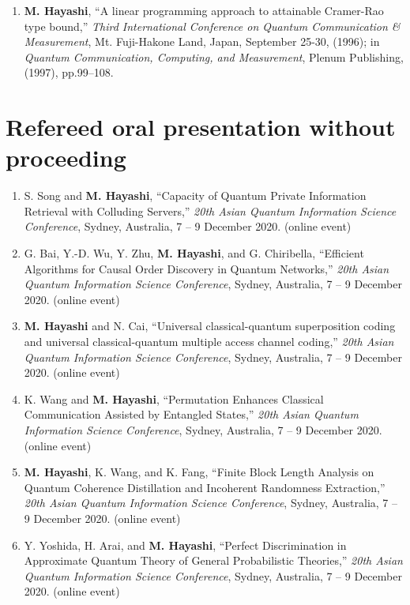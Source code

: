 \documentclass[a4paper,12pt,oneside]{article}
\begin{document}
\begin{enumerate}
\item
\textbf{M. Hayashi}, ``A linear programming approach to attainable Cramer-Rao type bound,'' 
{\em Third International Conference on Quantum Communication \& Measurement}, 
Mt. Fuji-Hakone Land, Japan, September 25-30, (1996);
in {\em Quantum Communication, Computing, and Measurement}, Plenum Publishing, (1997), 
pp.99--108.
\end{enumerate}

\section{Refereed oral presentation without proceeding}
\begin{enumerate}

\item
S. Song and \textbf{M. Hayashi},
``Capacity of Quantum Private Information Retrieval with Colluding Servers,''
{\em 20th Asian Quantum Information Science Conference},
Sydney, Australia, 7 -- 9 December 2020. (online event)

\item
G. Bai, Y.-D. Wu, Y. Zhu, \textbf{M. Hayashi}, and G. Chiribella,
``Efficient Algorithms for Causal Order Discovery in Quantum Networks,''
{\em 20th Asian Quantum Information Science Conference},
Sydney, Australia, 7 -- 9 December 2020. (online event)

\item
\textbf{M. Hayashi} and N. Cai,
``Universal classical-quantum superposition coding and universal classical-quantum multiple access channel coding,''
{\em 20th Asian Quantum Information Science Conference},
Sydney, Australia, 7 -- 9 December 2020. (online event)

\item
K. Wang and \textbf{M. Hayashi},
``Permutation Enhances Classical Communication Assisted by Entangled States,''
{\em 20th Asian Quantum Information Science Conference},
Sydney, Australia, 7 -- 9 December 2020. (online event)

\item
\textbf{M. Hayashi}, K. Wang, and K. Fang,
``Finite Block Length Analysis on Quantum Coherence Distillation and Incoherent Randomness Extraction,''
{\em 20th Asian Quantum Information Science Conference},
Sydney, Australia, 7 -- 9 December 2020. (online event)

\item
Y. Yoshida, H. Arai, and \textbf{M. Hayashi},
``Perfect Discrimination in Approximate Quantum Theory of General Probabilistic Theories,''
{\em 20th Asian Quantum Information Science Conference},
Sydney, Australia, 7 -- 9 December 2020. (online event)


\end{enumerate}
\end{document}
